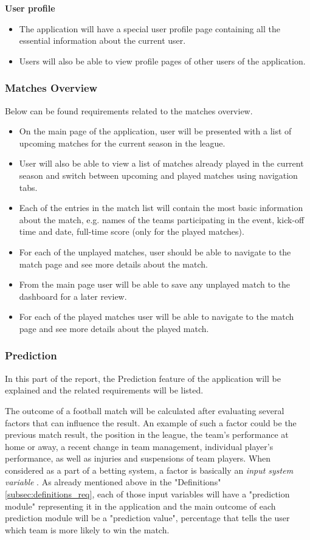 \textbf{User profile}
\begin{itemize}
	\item The application will have a special user profile page containing all the essential information about the current user.
	\item Users will also be able to view profile pages of other users of the application.
\end{itemize}

\subsubsection{Matches Overview}
\label{subsubsec:matchesoverview_req}
Below can be found requirements related to the matches overview.
\begin{itemize}
	\item On the main page of the application, user will be presented with a list of upcoming matches for the current season in the league.
   \item User will also be able to view a list of matches already played in the current season and switch between upcoming and played matches using navigation tabs.
   \item Each of the entries in the match list will contain the most basic information about the match, e.g. names of the teams participating in the event, kick-off time and date, full-time score (only for the played matches).
  \item For each of the unplayed matches, user should be able to navigate to the match page and see more details about the match.
 	\item From the main page user will be able to save any unplayed match to the dashboard for a later review.
 	\item For each of the played matches user will be able to navigate to the match page and see more details about the played match.
\end{itemize}

\subsubsection{Prediction}
\label{subsubsec:prediction_req}
In this part of the report, the Prediction feature of the application will be explained and the related requirements will be listed.

The outcome of a football match will be calculated after evaluating several factors that can influence the result. An example of such a factor could be the previous match result, the position in the league, the team’s performance at home or away, a recent change in team management, individual player’s performance, as well as injuries and suspensions of team players. When considered as a part of a betting system, a factor is basically an \emph{input system variable} \citep{art:simplebettingsystem}. As already mentioned above in the "Definitions" \ref{subsec:definitions_req}, each of those input variables will have a "prediction module" representing it in the application and the main outcome of each prediction module will be a "prediction value", percentage that tells the user which team is more likely to win the match.

